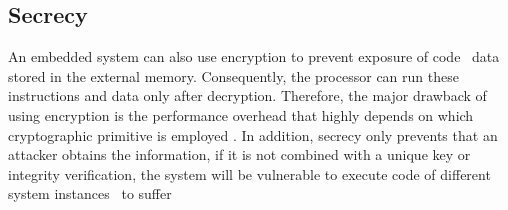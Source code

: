 \subsection{Secrecy}
\label{subsec:Secrecy}

An embedded system can also use encryption to prevent exposure of code \andor~data stored in the external memory. Consequently, the processor can run these instructions and data only after decryption. Therefore, the major drawback of using encryption is the performance overhead that highly depends on which cryptographic primitive is employed \cite{Suh2007:PUFs}. In addition, secrecy only prevents that an attacker obtains the information, if it is not combined with a unique key or integrity verification, the system will be vulnerable to execute code of different system instances \andor~to suffer  


